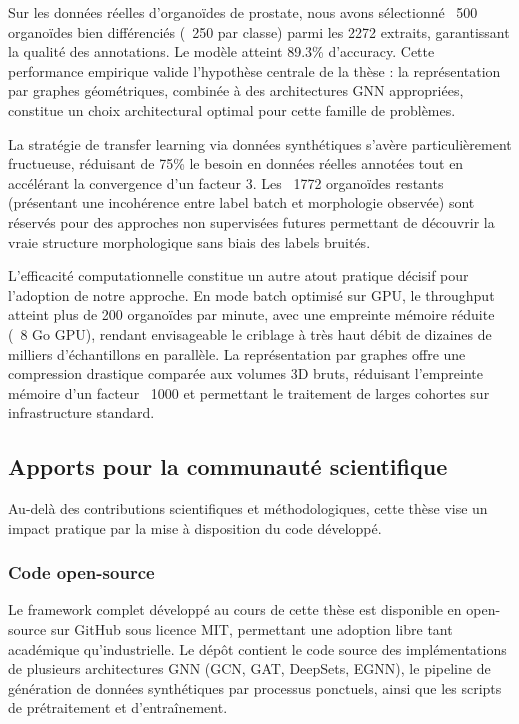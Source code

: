 Sur les données réelles d'organoïdes de prostate, nous avons sélectionné ~500 organoïdes bien différenciés (~250 par classe) parmi les 2272 extraits, garantissant la qualité des annotations. Le modèle atteint 89.3\% d'accuracy. Cette performance empirique valide l'hypothèse centrale de la thèse : la représentation par graphes géométriques, combinée à des architectures GNN appropriées, constitue un choix architectural optimal pour cette famille de problèmes.

La stratégie de transfer learning via données synthétiques s'avère particulièrement fructueuse, réduisant de 75\% le besoin en données réelles annotées tout en accélérant la convergence d'un facteur 3. Les ~1772 organoïdes restants (présentant une incohérence entre label batch et morphologie observée) sont réservés pour des approches non supervisées futures permettant de découvrir la vraie structure morphologique sans biais des labels bruités.

L'efficacité computationnelle constitue un autre atout pratique décisif pour l'adoption de notre approche. En mode batch optimisé sur GPU, le throughput atteint plus de 200 organoïdes par minute, avec une empreinte mémoire réduite (~8 Go GPU), rendant envisageable le criblage à très haut débit de dizaines de milliers d'échantillons en parallèle. La représentation par graphes offre une compression drastique comparée aux volumes 3D bruts, réduisant l'empreinte mémoire d'un facteur ~1000 et permettant le traitement de larges cohortes sur infrastructure standard.


\subsection{Apports pour la communauté scientifique}

Au-delà des contributions scientifiques et méthodologiques, cette thèse vise un impact pratique par la mise à disposition du code développé.

\subsubsection{Code open-source}

Le framework complet développé au cours de cette thèse est disponible en open-source sur GitHub sous licence MIT, permettant une adoption libre tant académique qu'industrielle. Le dépôt contient le code source des implémentations de plusieurs architectures GNN (GCN, GAT, DeepSets, EGNN), le pipeline de génération de données synthétiques par processus ponctuels, ainsi que les scripts de prétraitement et d'entraînement.

